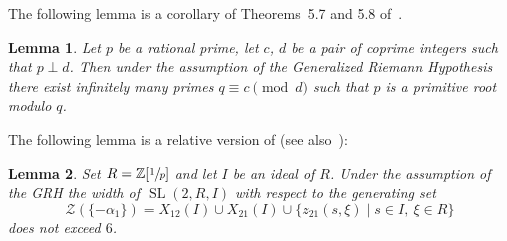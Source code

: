 \documentclass[oneside, 12pt]{amsart}
\theoremstyle{plain}
\numberwithin{equation}{section}
\newtheorem{lemma}{Lemma}
\numberwithin{lemma}{section}
\theoremstyle{definition}
\theoremstyle{remark}
\DeclareMathOperator{\SL}{SL}
\begin{document}
The following lemma is a corollary of Theorems~5.7 and 5.8 of~\cite{LSM}.
\begin{lemma}
Let $p$ be a rational prime, let $c$, $d$ be a pair of coprime integers such that $p \perp d$.
Then under the assumption of the Generalized Riemann Hypothesis there exist infinitely many primes $q\equiv c\pmod{d}$ such that $p$ is a primitive root modulo $q$.
\end{lemma}

The following lemma is a relative version of \cite[Lemma~6]{VavSmSuUnitrEng} (see also~\cite{VseUnitrZ1p}):

\begin{lemma}\label{lemma:Z1p}
Set $R=\mathbb{Z}[\sfrac{1}{p}]$ and let $I$ be an ideal of $R$.
Under the assumption of the GRH the width of $\SL(2, R, I)$ with respect to the generating set
\[ \mathcal{Z}(\{-\alpha_1\})=X_{12}(I)\cup X_{21}(I) \cup \{z_{21}(s, \xi) \mid s\in I,\ \xi\in R\} \]
does not exceed $6$.
\end{lemma}
\end{document}
